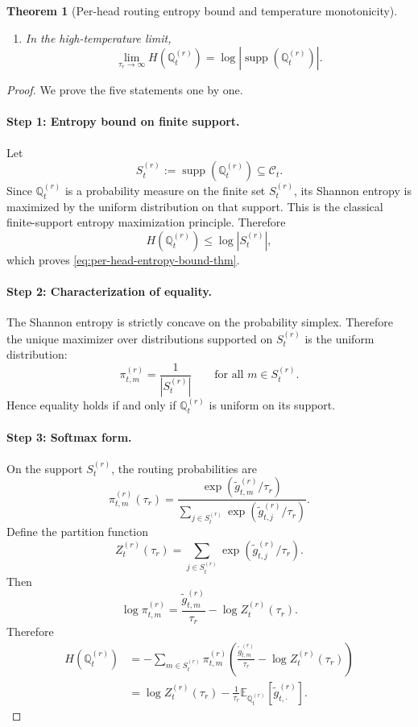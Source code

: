 \documentclass{article}
\theoremstyle{plain}
\newtheorem{theorem}{Theorem}[section]
\theoremstyle{definition}
\theoremstyle{remark}
\begin{document}
\begin{theorem}[Per-head routing entropy bound and temperature monotonicity]
\begin{enumerate}
    \item In the high-temperature limit,
    \begin{equation}
    \label{eq:entropy-high-temp-limit}
    \lim_{\tau_r\to\infty} H\!\left(\mathbb{Q}^{(r)}_{t}\right)
    =
    \log \left|\operatorname{supp}\!\left(\mathbb{Q}^{(r)}_{t}\right)\right|.
    \end{equation}
\end{enumerate}
\end{theorem}

\begin{proof}
We prove the five statements one by one.

\paragraph{Step 1: Entropy bound on finite support.}
Let
\[
S_{t}^{(r)} := \operatorname{supp}\!\left(\mathbb{Q}^{(r)}_{t}\right)
\subseteq \mathcal{C}_{t}.
\]
Since $\mathbb{Q}^{(r)}_{t}$ is a probability measure on the finite set $S_{t}^{(r)}$, its Shannon entropy is maximized by the uniform distribution on that support. This is the classical finite-support entropy maximization principle. Therefore
\[
H\!\left(\mathbb{Q}^{(r)}_{t}\right)\le \log |S_{t}^{(r)}|,
\]
which proves \eqref{eq:per-head-entropy-bound-thm}.

\paragraph{Step 2: Characterization of equality.}
The Shannon entropy is strictly concave on the probability simplex. Therefore the unique maximizer over distributions supported on $S_{t}^{(r)}$ is the uniform distribution:
\[
\pi^{(r)}_{t,m} = \frac{1}{|S_{t}^{(r)}|} \qquad \text{for all } m\in S_{t}^{(r)}.
\]
Hence equality holds if and only if $\mathbb{Q}^{(r)}_{t}$ is uniform on its support.

\paragraph{Step 3: Softmax form.}
On the support $S_{t}^{(r)}$, the routing probabilities are
\[
\pi^{(r)}_{t,m}(\tau_r)
=
\frac{\exp(\tilde g^{(r)}_{t,m}/\tau_r)}
{\sum_{j\in S_{t}^{(r)}} \exp(\tilde g^{(r)}_{t,j}/\tau_r)}.
\]
Define the partition function
\[
Z_{t}^{(r)}(\tau_r)
=
\sum_{j\in S_{t}^{(r)}} \exp(\tilde g^{(r)}_{t,j}/\tau_r).
\]
Then
\[
\log \pi^{(r)}_{t,m}
=
\frac{\tilde g^{(r)}_{t,m}}{\tau_r}
-
\log Z_{t}^{(r)}(\tau_r).
\]
Therefore
\begin{align}
H\!\left(\mathbb{Q}^{(r)}_{t}\right)
&=
-\sum_{m\in S_{t}^{(r)}} \pi^{(r)}_{t,m}
\left(
\frac{\tilde g^{(r)}_{t,m}}{\tau_r}
-
\log Z_{t}^{(r)}(\tau_r)
\right)
\\
&=
\log Z_{t}^{(r)}(\tau_r)
-
\frac{1}{\tau_r}
\mathbb{E}_{\mathbb{Q}^{(r)}_{t}}[\tilde g^{(r)}_{t,\cdot}].
\label{eq:entropy-partition-form}
\end{align}


\end{proof}
\end{document}
